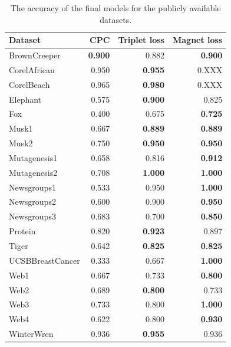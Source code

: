 \begin{table}[h!]
  \centering
  \begin{tabular}{lrrr}
    \toprule
    Dataset          & CPC            & Triplet loss   & Magnet loss \\
    \midrule
    BrownCreeper     & \textbf{0.900} & 0.882          & \textbf{0.900} \\
    CorelAfrican     & 0.950          & \textbf{0.955} & 0.XXX \\
    CorelBeach       & 0.965          & \textbf{0.980} & 0.XXX \\
    Elephant         & 0.575          & \textbf{0.900} & 0.825 \\
    Fox              & 0.400          & 0.675          & \textbf{0.725} \\
    Musk1            & 0.667          & \textbf{0.889} & \textbf{0.889} \\
    Musk2            & 0.750          & \textbf{0.950} & \textbf{0.950} \\
    Mutagenesis1     & 0.658          & 0.816          & \textbf{0.912} \\
    Mutagenesis2     & 0.708          & \textbf{1.000} & \textbf{1.000} \\
    Newsgroups1      & 0.533          & 0.950          & \textbf{1.000} \\
    Newsgroups2      & 0.600          & 0.900          & \textbf{0.950} \\
    Newsgroups3      & 0.683          & 0.700          & \textbf{0.850} \\
    Protein          & 0.820          & \textbf{0.923} & 0.897 \\
    Tiger            & 0.642          & \textbf{0.825} & \textbf{0.825} \\
    UCSBBreastCancer & 0.333          & 0.667          & \textbf{1.000} \\
    Web1             & 0.667          & 0.733          & \textbf{0.800} \\
    Web2             & 0.689          & \textbf{0.800} & 0.733 \\
    Web3             & 0.733          & 0.800          & \textbf{1.000} \\
    Web4             & 0.622          & 0.800          & \textbf{0.930} \\
    WinterWren       & 0.936          & \textbf{0.955} & 0.936 \\
    \bottomrule
  \end{tabular}
  \caption{The accuracy of the final models for the publicly available datasets.}\label{tab:public-accuracy}
\end{table}


